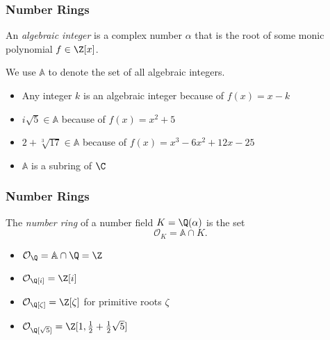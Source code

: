 \begin{frame}
	\frametitle{Number Rings}

	\pause


	\begin{definition}
		An \emph{algebraic integer} is a complex number $\alpha$ that is the root of some monic polynomial $f \in \Z[x]$.

		\pause \medskip

		We use $\mathbb A$ to denote the set of all algebraic integers.
	\end{definition}

	\pause \medskip

	\begin{itemize}[<+->]
		\item Any integer $k$ is an algebraic integer because of $f(x) = x - k$
		\item $i \sqrt 5 \in \mathbb A$ because of $f(x) = x^2 + 5$
		\item $2 + \sqrt[3]{17} \in \mathbb A$ because of $f(x) = x^3 - 6 x^2 + 12 x - 25$
		\item $\mathbb A$ is a subring of $\C$
	\end{itemize}

\end{frame}

\begin{frame}
	\frametitle{Number Rings}

	\begin{definition}
		The \emph{number ring} of a number field $K = \Q(\alpha)$ is the set
		\begin{equation*}
			\mathcal O_K = \mathbb A \cap K.
		\end{equation*}
	\end{definition}

	\bigskip \pause

	\begin{itemize}[<+->]
		\item $\mathcal O_{\Q} = \mathbb A \cap \Q = \Z$ %
		\item $\mathcal O_{\Q[i]} = \Z[i]$
		\item $\mathcal O_{\Q[\zeta]} = \Z[\zeta]$ for primitive roots $\zeta$
		\item $\mathcal O_{\Q[\sqrt 5]} = \Z [1, \frac12 + \frac12 \sqrt 5]$
	\end{itemize}

\end{frame}


